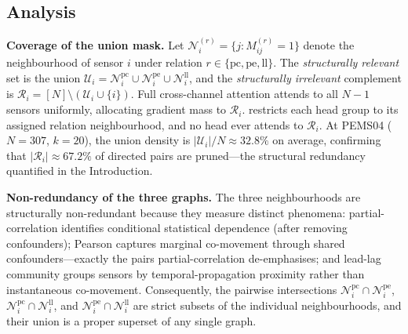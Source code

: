 \subsection{Analysis}
\label{sec:coverage}

\textbf{Coverage of the union mask.}
Let $\mathcal{N}^{(r)}_i = \{j : M^{(r)}_{ij} = 1\}$ denote the neighbourhood of
sensor $i$ under relation $r \in \{\text{pc},\text{pe},\text{ll}\}$.
The \emph{structurally relevant} set is the union
$\mathcal{U}_i = \mathcal{N}^{\text{pc}}_i \cup \mathcal{N}^{\text{pe}}_i \cup \mathcal{N}^{\text{ll}}_i$,
and the \emph{structurally irrelevant} complement is
$\mathcal{R}_i = [N] \setminus (\mathcal{U}_i \cup \{i\})$.
Full cross-channel attention attends to all $N{-}1$ sensors uniformly, allocating
gradient mass to $\mathcal{R}_i$.
\mr{} restricts each head group to its assigned relation neighbourhood, and no head
ever attends to $\mathcal{R}_i$.
At PEMS04 ($N{=}307$, $k{=}20$), the union density is
$|\mathcal{U}_i|/N \approx 32.8\%$ on average, confirming that $|\mathcal{R}_i|
\approx 67.2\%$ of directed pairs are pruned---the structural redundancy
quantified in the Introduction.

\textbf{Non-redundancy of the three graphs.}
The three neighbourhoods are structurally non-redundant because they measure distinct phenomena:
partial-correlation identifies conditional statistical dependence (after removing confounders);
Pearson captures marginal co-movement through shared confounders---exactly the pairs
partial-correlation de-emphasises; and lead-lag community groups sensors by
temporal-propagation proximity rather than instantaneous co-movement.
Consequently, the pairwise intersections
$\mathcal{N}^{\text{pc}}_i \cap \mathcal{N}^{\text{pe}}_i$,
$\mathcal{N}^{\text{pc}}_i \cap \mathcal{N}^{\text{ll}}_i$, and
$\mathcal{N}^{\text{pe}}_i \cap \mathcal{N}^{\text{ll}}_i$
are strict subsets of the individual neighbourhoods, and their union
is a proper superset of any single graph.

